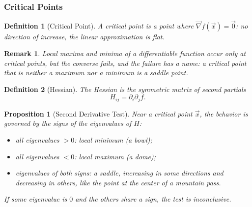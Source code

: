 \documentclass{article}
\newtheorem{definition}{Definition}
\newtheorem{remark}{Remark}
\newtheorem{proposition}{Proposition}
\begin{document}
\subsubsection{Critical Points}
\begin{definition}[Critical Point]
    A critical point is a point where $\vec{\nabla} f(\vec{x}) = \vec{0}$: no direction of increase, the linear approximation is flat.
\end{definition}
\begin{remark}
    Local maxima and minima of a differentiable function occur only at critical points, but the converse fails, and the failure has a name: a critical point that is neither a maximum nor a minimum is a saddle point.
\end{remark}
\begin{definition}[Hessian]
    The Hessian is the symmetric matrix of second partials
    \begin{equation}
        \label{eq:hessian}
        H_{ij} = \partial_i\partial_j f.
    \end{equation}
\end{definition}
\begin{proposition}[Second Derivative Test]
    Near a critical point $\vec{x}$, the behavior is governed by the signs of the eigenvalues of $H$:
    \begin{itemize}
        \item all eigenvalues $>0$: local minimum (a bowl);
        \item all eigenvalues $<0$: local maximum (a dome);
        \item eigenvalues of both signs: a saddle, increasing in some directions and decreasing in others, like the point at the center of a mountain pass.
    \end{itemize}
    If some eigenvalue is $0$ and the others share a sign, the test is inconclusive.
\end{proposition}
\end{document}
